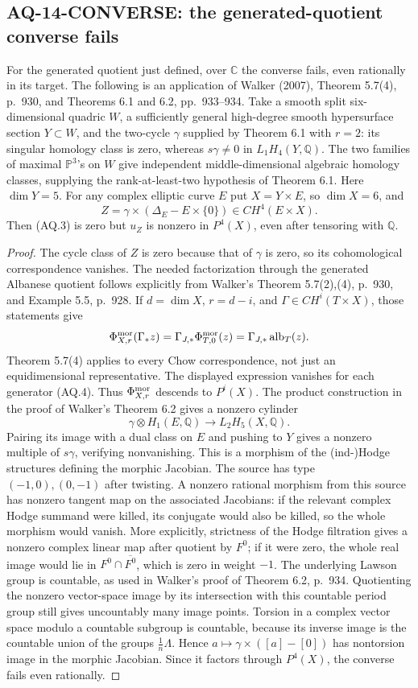 \subsection{AQ-14-CONVERSE: the generated-quotient converse fails}
For the generated quotient just defined, over $\mathbb C$
the converse fails, even rationally in its target.
The following is an application of Walker (2007), Theorem 5.7(4),
p.~930, and Theorems 6.1 and 6.2, pp.~933--934.
Take a smooth split six-dimensional quadric $W$,
a sufficiently general high-degree smooth hypersurface section
$Y\subset W$, and the two-cycle $\gamma$ supplied by Theorem 6.1
with $r=2$: its singular homology class is zero, whereas
$s\gamma\ne0$ in $L_1H_4(Y,\mathbb Q)$.
The two families of maximal $\mathbb P^3$'s on $W$
give independent middle-dimensional algebraic
homology classes, supplying the rank-at-least-two
hypothesis of Theorem 6.1.
Here $\dim Y=5$. For any complex elliptic curve $E$ put
$X=Y\times E$, so $\dim X=6$, and
\[
 Z=\gamma\times(\Delta_E-E\times\{0\})\in CH^4(E\times X).
\]
Then (AQ.3) is zero but $u_Z$ is nonzero in $P^4(X)$,
even after tensoring with $\mathbb Q$.
\begin{proof}
The cycle class of $Z$ is zero because that of $\gamma$ is zero,
so its cohomological correspondence vanishes.
The needed factorization through the generated Albanese
quotient follows explicitly from Walker's Theorem 5.7(2),(4),
p.~930, and Example 5.5, p.~928. If $d=\dim X$,
$r=d-i$, and $\Gamma\in CH^i(T\times X)$, those statements give
\[
 \Phi^{\rm mor}_{X,r}(\Gamma_*z)
    =\Gamma_{J,*}\Phi^{\rm mor}_{T,0}(z)
    =\Gamma_{J,*}\operatorname{alb}_T(z).
\]
Theorem 5.7(4) applies to every Chow correspondence, not just
an equidimensional representative. The displayed expression
vanishes for each generator (AQ.4). Thus
$\Phi^{\rm mor}_{X,r}$ descends to $P^i(X)$.
The product construction in the proof of Walker's Theorem 6.2
gives a nonzero cylinder
\[
 \gamma\otimes H_1(E,\mathbb Q)\longrightarrow L_2H_5(X,\mathbb Q).
\]
Pairing its image with a dual class on $E$ and pushing to $Y$
gives a nonzero multiple of $s\gamma$, verifying nonvanishing.
This is a morphism of the (ind-)Hodge structures defining
the morphic Jacobian. The source has type $(-1,0),(0,-1)$
after twisting. A nonzero rational morphism from this source
has nonzero tangent map on the associated Jacobians: if the
relevant complex Hodge summand were killed, its conjugate
would also be killed, so the whole morphism would vanish.
More explicitly, strictness of the Hodge filtration gives
a nonzero complex linear map after quotient by $F^0$;
if it were zero, the whole real image would lie in
$F^0\cap\overline{F^0}$, which is zero in weight $-1$.
The underlying Lawson group is countable, as used in
Walker's proof of Theorem 6.2, p.~934. Quotienting the
nonzero vector-space image by its intersection with
this countable period group still gives uncountably
many image points. Torsion in a complex vector space
modulo a countable subgroup is countable, because
its inverse image is the countable union of the
groups $\tfrac1n\Lambda$. Hence
$a\mapsto\gamma\times([a]-[0])$ has nontorsion image
in the morphic Jacobian.
Since it factors through $P^4(X)$, the converse fails
even rationally.
\end{proof}
